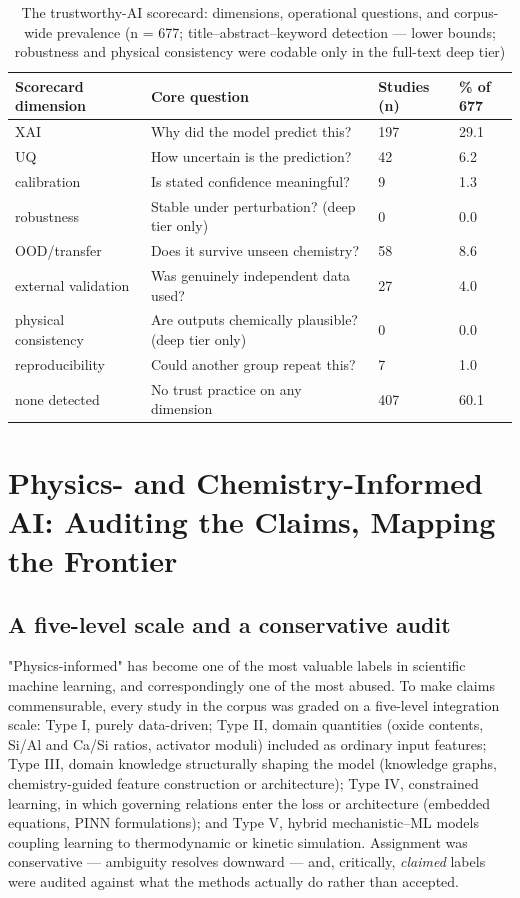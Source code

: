 \documentclass[pdflatex,sn-basic]{sn-jnl}
\begin{document}
\begin{table}[htbp]
\caption{The trustworthy-AI scorecard: dimensions, operational questions, and corpus-wide prevalence (n = 677; title--abstract--keyword detection --- lower bounds; robustness and physical consistency were codable only in the full-text deep tier)}
\centering
{\footnotesize
\begin{tabular}{p{}p{}p{}l}
\toprule
Scorecard dimension & Core question & Studies (n) & \% of 677 \\
\midrule
XAI & Why did the model predict this? & 197 & 29.1 \\
UQ & How uncertain is the prediction? & 42 & 6.2 \\
calibration & Is stated confidence meaningful? & 9 & 1.3 \\
robustness & Stable under perturbation? (deep tier only) & 0 & 0.0 \\
OOD/transfer & Does it survive unseen chemistry? & 58 & 8.6 \\
external validation & Was genuinely independent data used? & 27 & 4.0 \\
physical consistency & Are outputs chemically plausible? (deep tier only) & 0 & 0.0 \\
reproducibility & Could another group repeat this? & 7 & 1.0 \\
none detected & No trust practice on any dimension & 407 & 60.1 \\
\bottomrule
\end{tabular}}
\end{table}

\section{Physics- and Chemistry-Informed AI: Auditing the Claims, Mapping the Frontier}

\subsection{A five-level scale and a conservative audit}

"Physics-informed" has become one of the most valuable labels in scientific machine learning, and correspondingly one of the most abused. To make claims commensurable, every study in the corpus was graded on a five-level integration scale: Type I, purely data-driven; Type II, domain quantities (oxide contents, Si/Al and Ca/Si ratios, activator moduli) included as ordinary input features; Type III, domain knowledge structurally shaping the model (knowledge graphs, chemistry-guided feature construction or architecture); Type IV, constrained learning, in which governing relations enter the loss or architecture (embedded equations, PINN formulations); and Type V, hybrid mechanistic--ML models coupling learning to thermodynamic or kinetic simulation. Assignment was conservative --- ambiguity resolves downward --- and, critically, \emph{claimed} labels were audited against what the methods actually do rather than accepted.
\end{document}
